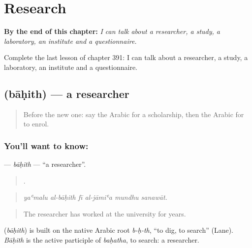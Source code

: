 
\chapter{Research}
\label{ch:ar-research}

\begin{chapteropening}
\textbf{By the end of this chapter:} \emph{I can talk about a researcher, a study, a laboratory, an institute and a questionnaire.}

Complete the last lesson of chapter 391: I can talk about a researcher, a study, a laboratory, an institute and a questionnaire.
\end{chapteropening}

\section[\texorpdfstring{\ar{باحث} (bāḥith)}{باحث (bāḥith)}]{ (bāḥith) — a researcher}

\label{lesson:AR-C391-bahith}



\begin{quote}
Before the new one: say the Arabic for a scholarship, then the Arabic for to enrol.
\end{quote}

\subsection*{You'll want to know: }
\textbf{} — \emph{bāḥith} — \textquotedblleft{}a researcher\textquotedblright{}.

\begin{quote}
     .
\end{quote}

\begin{quote}
\emph{yaʿmalu al-bāḥith fī al-jāmiʿa mundhu sanawāt.}
\end{quote}

\begin{quote}
The researcher has worked at the university for years.
\end{quote}

\begin{cousinweb}
\textbf{} (\emph{bāḥith}) is built on the native Arabic root \emph{b-ḥ-th}, \textquotedblleft{}to dig, to search\textquotedblright{} (Lane). \emph{Bāḥith} is the active participle of \emph{baḥatha}, to search: a researcher.
\end{cousinweb}

